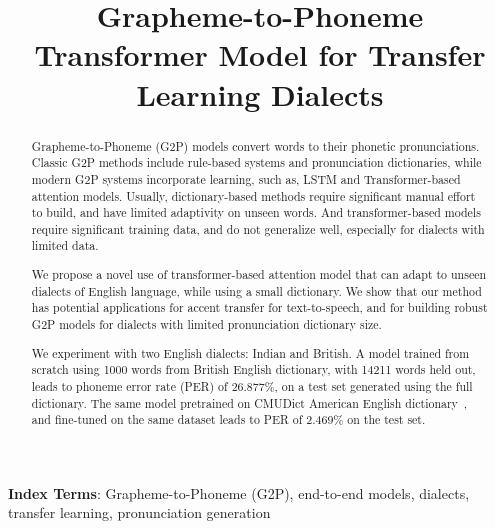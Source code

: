 \documentclass[a4paper]{article}
\title{Grapheme-to-Phoneme Transformer Model for Transfer Learning Dialects}
\begin{document}
\maketitle

\begin{abstract}
Grapheme-to-Phoneme (G2P) models convert words to their phonetic pronunciations. Classic G2P methods include rule-based systems and pronunciation dictionaries, while modern G2P systems incorporate learning, such as, LSTM and Transformer-based attention models. Usually, dictionary-based methods require significant manual effort to build, and have limited adaptivity on unseen words. And transformer-based models require significant training data, and do not generalize well, especially for dialects with limited data.

We propose a novel use of transformer-based attention model that can adapt to unseen dialects of English language, while using a small dictionary. We show that our method has potential applications for accent transfer for text-to-speech, and for building robust G2P models for dialects with limited pronunciation dictionary size.

We experiment with two English dialects: Indian and British. A model trained from scratch using 1000 words from British English dictionary, with 14211 words held out, leads to phoneme error rate (PER) of 26.877\%, on a test set generated using the full dictionary. The same model pretrained on CMUDict American English dictionary~\cite{weide2005carnegie}, and fine-tuned on the same dataset leads to PER of 2.469\% on the test set.
\end{abstract}

\noindent\textbf{Index Terms}: Grapheme-to-Phoneme (G2P), end-to-end models, dialects, transfer learning, pronunciation generation









\end{document}
